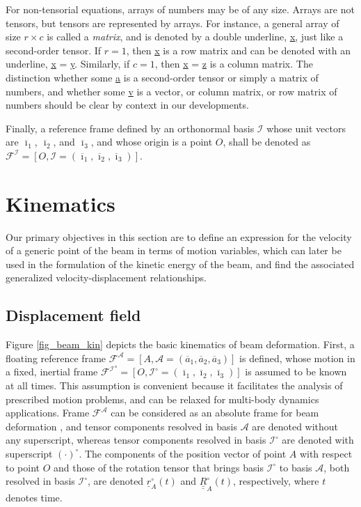 \documentclass[12pt,a4paper,oneside,english]{abntex2} %
\newcommand{\vect}[1]{\underline{#1}}
\newcommand{\uvec}[1]{\overline{#1}}
\def\tens#1{\underline{\underline{#1}}}
\def\lb{\left[}
\def\rb{\right]}
\def\A{\mathcal{A}}
\def\Io{\mathcal{I}^{\circ}}
\def\R{\tens{R}}
\def\RAo{\R^{\circ}_A}
\def\r{\vect{r}}
\begin{document}
For non-tensorial equations, arrays of numbers may be of any size. Arrays are not tensors, but tensors are represented by arrays. For instance, a general array of size $r \times c$ is called a \textit{matrix}, and is denoted by a double underline, \tens{x}, just like a second-order tensor. If $r = 1$, then \tens{x} is a row matrix and can be denoted with an underline, \tens{x} = \vect{y}. Similarly, if $c = 1$, then \tens{x} = \vect{z} is a column matrix. The distinction whether some \tens{a} is a second-order tensor or simply a matrix of numbers, and whether some \vect{v} is a vector, or column matrix, or row matrix of numbers should be clear by context in our developments.

Finally, a reference frame defined by an orthonormal basis $\mathcal{I}$ whose unit vectors are $\uvec{\imath}_1$, $\uvec{\imath}_2$, and $\uvec{\imath}_3$, and whose origin is a point $O$, shall be denoted as $\mathcal{F^I} = \left[O,\mathcal{I}=(\uvec{\imath}_1,\uvec{\imath}_2,\uvec{\imath}_3)\right]$.

\section{Kinematics}
\label{sec:kin}

Our primary objectives in this section are to define an expression for the velocity of a generic point of the beam in terms of motion variables, which can later be used in the formulation of the kinetic energy of the beam, and find the associated generalized velocity-displacement relationships. 

\subsection{Displacement field}

Figure \ref{fig_beam_kin} depicts the basic kinematics of beam deformation. First, a floating reference frame $\mathcal{F^A} = \lb A,\A=(\uvec{a}_1,\uvec{a}_2,\uvec{a}_3) \rb$ is defined, whose motion in a fixed, inertial frame $\mathcal{F^I}^{\circ} = \lb O,\Io=(\uvec{\imath}_1,\uvec{\imath}_2,\uvec{\imath}_3) \rb$ is assumed to be known at all times. This assumption is convenient because it facilitates the analysis of prescribed motion problems, and can be relaxed for multi-body dynamics applications. Frame $\mathcal{F^A}$ can be considered as an absolute frame for beam deformation \cite{hodges2006nonlinear}, and tensor components resolved in basis $\A$ are denoted without any superscript, whereas tensor components resolved in basis $\Io$ are denoted with superscript $(\cdot{})^{\circ}$. The components of the position vector of point $A$ with respect to point $O$ and those of the rotation tensor \cite{bauchau2011flexible} that brings basis $\Io$ to basis $\A$, both resolved in basis $\Io$, are denoted $\r^{\circ}_A(t)$ and $\RAo(t)$, respectively, where $t$ denotes time.
\end{document}
